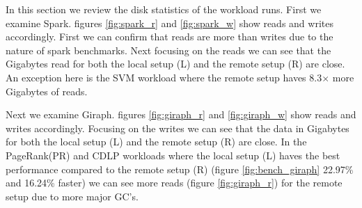  In this section we review the disk statistics of the workload runs. First we examine Spark. figures \ref{fig:spark_r} and \ref{fig:spark_w} show reads and writes accordingly. First we can confirm that reads are more than writes due to the nature of spark benchmarks. Next focusing on the reads we can see that the Gigabytes read for both the local setup (L) and the remote setup (R) are close. An exception here is the SVM workload where the remote setup haves 8.3$\times$ more Gigabytes of reads.
 
 Next we examine Giraph. figures \ref{fig:giraph_r} and \ref{fig:giraph_w} show reads and writes accordingly. Focusing on the writes we can see that the data in Gigabytes for both the local setup (L) and the remote setup (R) are close. In the PageRank(PR)	and CDLP workloads where the local setup (L) haves the best performance compared to the remote setup (R) (figure \ref{fig:bench_giraph} 22.97\% and 16.24\% faster) we can see more reads (figure \ref{fig:giraph_r}) for the remote setup due to more major GC's.

